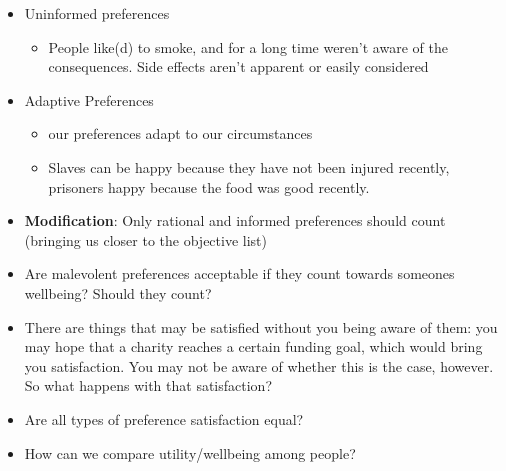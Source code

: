 \documentclass{article}
\begin{document}
        \begin{itemize}
            \item Uninformed preferences
            \begin{itemize}
                \item People like(d) to smoke, and for a long time weren't aware of the consequences. Side effects aren't apparent or easily considered
            \end{itemize}{}
            \item Adaptive Preferences 
            \begin{itemize}
                \item our preferences adapt to our circumstances
                \item Slaves can be happy because they have not been injured recently, prisoners happy because the food was good recently.
            \end{itemize}{}
            \item \textbf{Modification}: Only rational and informed preferences should count (bringing us closer to the objective list)
            \item Are malevolent preferences acceptable if they count towards someones wellbeing? Should they count?
            \item There are things that may be satisfied without you being aware of them: you may hope that a charity reaches a certain funding goal, which would bring you satisfaction. You may not be aware of whether this is the case, however. So what happens with that satisfaction?
            \item Are all types of preference satisfaction equal?
            \item How can we compare utility/wellbeing among people?
        \end{itemize}{}
        
        
        
\end{document}
